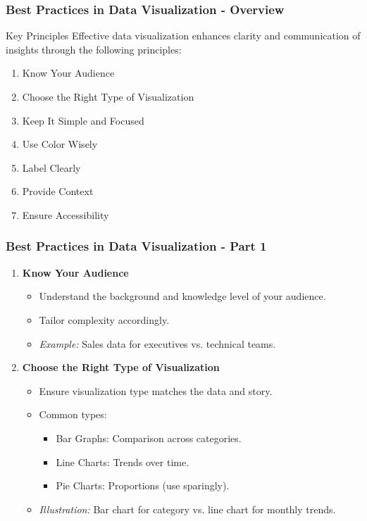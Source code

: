 \documentclass[aspectratio=169]{beamer}
\begin{document}
\begin{frame}[fragile]
    \frametitle{Best Practices in Data Visualization - Overview}
    \begin{block}{Key Principles}
        Effective data visualization enhances clarity and communication of insights through the following principles:
    \end{block}
    \begin{enumerate}
        \item Know Your Audience
        \item Choose the Right Type of Visualization
        \item Keep It Simple and Focused
        \item Use Color Wisely
        \item Label Clearly
        \item Provide Context
        \item Ensure Accessibility
    \end{enumerate}
\end{frame}

\begin{frame}[fragile]
    \frametitle{Best Practices in Data Visualization - Part 1}
    \begin{enumerate}
        \setcounter{enumi}{0}
        \item \textbf{Know Your Audience}
            \begin{itemize}
                \item Understand the background and knowledge level of your audience.
                \item Tailor complexity accordingly. 
                \item \textit{Example:} Sales data for executives vs. technical teams.
            \end{itemize}
        
        \item \textbf{Choose the Right Type of Visualization}
            \begin{itemize}
                \item Ensure visualization type matches the data and story.
                \item Common types:
                \begin{itemize}
                    \item Bar Graphs: Comparison across categories.
                    \item Line Charts: Trends over time.
                    \item Pie Charts: Proportions (use sparingly).
                \end{itemize}
                \item \textit{Illustration:} Bar chart for category vs. line chart for monthly trends.
            \end{itemize}
    \end{enumerate}
\end{frame}
\end{document}

